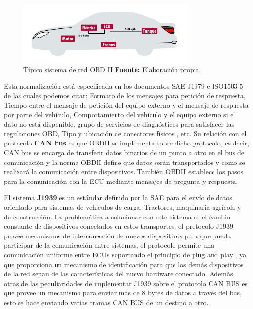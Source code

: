 \begin{figure}[H]
	\centering
	\includegraphics[width=0.8\textwidth]{./Cap3imagen/obd.pdf}
	\caption [Típico sistema de red CAN.]{Típico sistema de red OBD II\textbf{ Fuente:} %
		Elaboración propia.}
	\label{fig_obd_c3} %
\end{figure}

Esta normalización está especificada en los documentos SAE J1979 e ISO1503-5 de las cuales podemos citar: Formato de los mensajes para petición de respuesta, Tiempo entre el mensaje de petición del equipo externo y el mensaje de respuesta por parte del vehículo, Comportamiento del vehículo y el equipo externo si el dato no está disponible, grupo de servicios de diagnósticos para satisfacer las regulaciones OBD, Tipo y ubicación de conectores físicos \cite{list_c3}, etc. Su relación con el protocolo {\bfseries CAN bus} es que OBDII se implementa sobre dicho protocolo, es decir, CAN bus se encarga de transferir datos binarios de un punto a otro en el bus de comunicación y  la norma OBDII define que datos serán transportados y como se realizará la comunicación entre dispositivos. También OBDII establece los pasos para la comunicación con la ECU mediante mensajes de pregunta y respuesta. 

El sistema {\bfseries J1939} es un estándar definido por la SAE para el envío de datos orientado para sistemas de vehículos de carga, Tractores,  maquinaria agrícola y de construcción.  La problemática a solucionar con este sistema es el cambio constante de dispositivos conectados en estos transportes, el protocolo J1939 provee mecanismos de interconección de nuevos dispositivos para que pueda participar de la comunicación entre sistemas, el protocolo permite una comunicación uniforme entre ECUs soportando el principio de plug and play \cite{j19_c3}, ya que proporciona un mecanismo de identificación para que los demás dispositivos de la red sepan de las características del nuevo hardware conectado. Además, otras de las peculiaridades de implementar J1939 sobre el protocolo CAN BUS es que provee un mecanismo para enviar más de 8 bytes de datos a través del bus, esto se hace enviando varias tramas CAN BUS de un destino a otro. 


